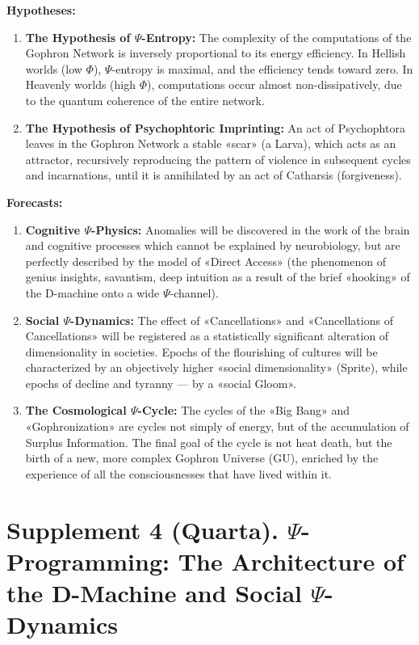 \documentclass[a4paper,12pt]{article}
\begin{document}
	\textbf{Hypotheses:}
	\begin{enumerate}
		\item \textbf{The Hypothesis of $\Psi$-Entropy:} The complexity of the computations of the Gophron Network is inversely proportional to its energy efficiency. In Hellish worlds (low $\Phi$), $\Psi$-entropy is maximal, and the efficiency tends toward zero. In Heavenly worlds (high $\Phi$), computations occur almost non-dissipatively, due to the quantum coherence of the entire network.
		\item \textbf{The Hypothesis of Psychophtoric Imprinting:} An act of Psychophtora leaves in the Gophron Network a stable «scar» (a Larva), which acts as an attractor, recursively reproducing the pattern of violence in subsequent cycles and incarnations, until it is annihilated by an act of Catharsis (forgiveness).
	\end{enumerate}
	
	\textbf{Forecasts:}
	\begin{enumerate}
		\item \textbf{Cognitive $\Psi$-Physics:} Anomalies will be discovered in the work of the brain and cognitive processes which cannot be explained by neurobiology, but are perfectly described by the model of «Direct Access» (the phenomenon of genius insights, savantism, deep intuition as a result of the brief «hooking» of the D-machine onto a wide $\Psi$-channel).
		\item \textbf{Social $\Psi$-Dynamics:} The effect of «Cancellations» and «Cancellations of Cancellations» will be registered as a statistically significant alteration of dimensionality in societies. Epochs of the flourishing of cultures will be characterized by an objectively higher «social dimensionality» (Sprite), while epochs of decline and tyranny — by a «social Gloom».
		\item \textbf{The Cosmological $\Psi$-Cycle:} The cycles of the «Big Bang» and «Gophronization» are cycles not simply of energy, but of the accumulation of Surplus Information. The final goal of the cycle is not heat death, but the birth of a new, more complex Gophron Universe (GU), enriched by the experience of all the consciousnesses that have lived within it.
	\end{enumerate}
	
	\newpage
	\section{Supplement 4 (Quarta). $\Psi$-Programming: The Architecture of the D-Machine and Social $\Psi$-Dynamics}
	
\end{document}

